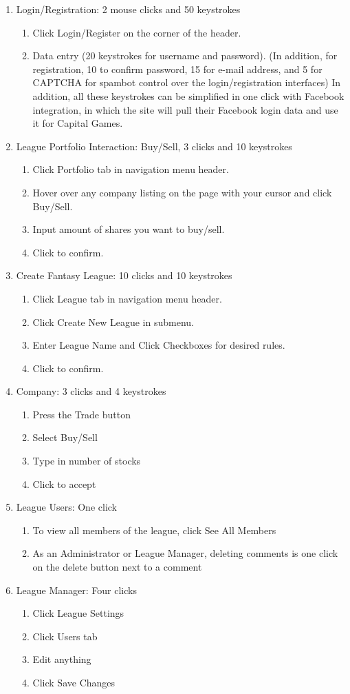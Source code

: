 \begin{enumerate}
\item Login/Registration: 2 mouse clicks and 50 keystrokes
\begin{enumerate}
\item Click Login/Register on the corner of the header.
\item Data entry (20 keystrokes for username and password). (In addition, for registration, 10 to confirm password, 15 for e-mail address, and 5 for CAPTCHA for spambot control over the login/registration interfaces)
In addition, all these keystrokes can be simplified in one click with Facebook integration, in which the site will pull their Facebook login data and use it for Capital Games.
\end{enumerate}
\item League Portfolio Interaction: Buy/Sell, 3 clicks and 10 keystrokes
\begin{enumerate}
\item Click Portfolio tab in navigation menu header.
\item Hover over any company listing on the page with your cursor and click Buy/Sell.
\item Input amount of shares you want to buy/sell. 
\item Click to confirm.
\end{enumerate}
\item Create Fantasy League: 10 clicks and 10 keystrokes
\begin{enumerate}
\item Click League tab in navigation menu header.
\item Click Create New League in submenu.
\item Enter League Name and Click Checkboxes for desired rules.
\item Click to confirm.
\end{enumerate}
\item Company: 3 clicks and 4 keystrokes
\begin{enumerate}
\item Press the Trade button
\item Select Buy/Sell 
\item Type in number of stocks 
\item Click to accept
\end{enumerate}
\item League Users: One click
\begin{enumerate}
\item To view all members of the league, click See All Members
\item As an Administrator or League Manager, deleting comments is one click on the delete button next to a comment
\end{enumerate}
\item League Manager: Four clicks
\begin{enumerate}
\item Click League Settings
\item Click Users tab
\item Edit anything
\item Click Save Changes
\end{enumerate}


\end{enumerate}
